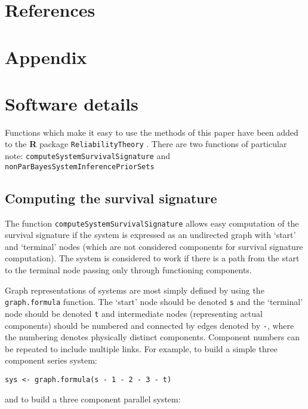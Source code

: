 \documentclass[12pt, a4paper]{elsarticle}
\begin{document}

\section*{References}





\section*{Appendix}
\appendix
\renewcommand*{\thesection}{\Alph{section}}
\section{Software details}
\label{ap:software}

Functions which make it easy to use the methods of this paper have been added to the \textbf{R} package \texttt{ReliabilityTheory} \citep{2015:aslett-RT}.  There are two functions of particular note: \texttt{computeSystemSurvivalSignature} and \texttt{nonParBayesSystemInferencePriorSets}

\subsection{Computing the survival signature}

The function \texttt{computeSystemSurvivalSignature} allows easy 
computation of the survival signature if the system is expressed as an
undirected graph with `start' and `terminal' nodes (which are not
considered components for survival signature computation).  The system
is considered to work if there is a path from the start to the terminal
node passing only through functioning components.

Graph representations of systems are most simply defined by using the 
\texttt{graph.formula} function.  The `start' node should be denoted
\texttt{s} and the `terminal' node should be denoted \texttt{t} and
intermediate nodes (representing actual components) should be numbered and
connected by edges denoted by \texttt{-}, where the numbering denotes physically
distinct components.  Component numbers can be repeated to include
multiple links.  For example, to build a simple three component series
system:

\noindent\texttt{sys <- graph.formula(s\,-\,1\,-\,2\,-\,3\,-\,t)}

and to build a three component parallel system:
\end{document}
